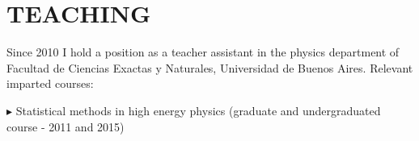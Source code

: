 \documentclass[letterpaper]{article}
\renewenvironment{itemize}{
  \begin{list}{}{
    \setlength{\leftmargin}{1.5em}
  }
}{
  \end{list}
}
\begin{document}
%  


\section*{TEACHING}

Since 2010 I hold a position as a teacher assistant in the physics department of Facultad de Ciencias Exactas y Naturales, Universidad de Buenos Aires. Relevant imparted courses:
\begin{itemize}
 \item{$\blacktriangleright$} Statistical methods in high energy physics (graduate and undergraduated course - 2011 and 2015)
\end{itemize}
\end{document}
